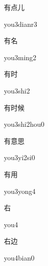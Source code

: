 \begin{verbete}{有点儿}
\begin{pronuncia}{you3dianr3}
\end{pronuncia}
\end{verbete}

\begin{verbete}{有名}
\begin{pronuncia}{you3ming2}
\end{pronuncia}
\end{verbete}

\begin{verbete}{有时}
\begin{pronuncia}{you3shi2}
\end{pronuncia}
\end{verbete}

\begin{verbete}{有时候}
\begin{pronuncia}{you3shi2hou0}
\end{pronuncia}
\end{verbete}

\begin{verbete}[you3yi2si0]{有意思}
\begin{pronuncia}{you3yi2si0}
\end{pronuncia}
\end{verbete}

\begin{verbete}{有用}
\begin{pronuncia}{you3yong4}
\end{pronuncia}
\end{verbete}

\begin{verbete}[you4]{右}
\begin{pronuncia}{you4}
\end{pronuncia}
\end{verbete}

\begin{verbete}{右边}
\begin{pronuncia}{you4bian0}
\end{pronuncia}
\end{verbete}

